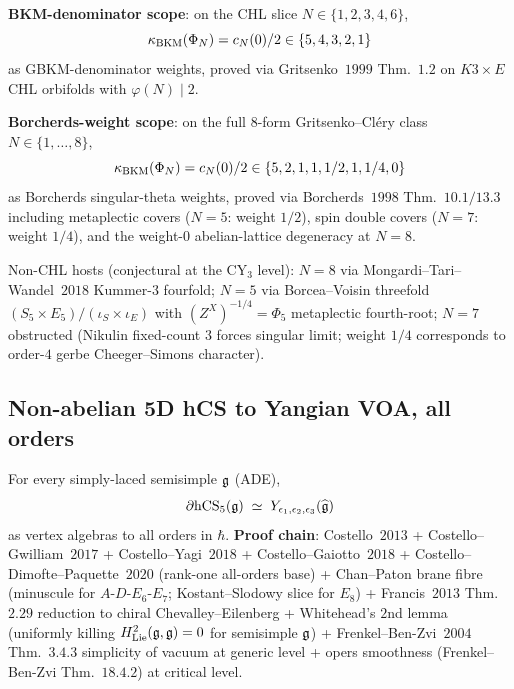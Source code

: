 \begin{theorem}\ClaimStatusTheorem
\label{wn:thm:plat-universal-kBKM}
\textbf{BKM-denominator scope}: on the CHL slice
$N \in \{1, 2, 3, 4, 6\}$,
\[
\kappa_{\mathrm{BKM}}(\Phi_N) = c_N(0)/2 \in \{5, 4, 3, 2, 1\}
\]
as GBKM-denominator weights, proved via Gritsenko~$1999$ Thm.~$1.2$ on
$K3 \times E$ CHL orbifolds with $\varphi(N) \mid 2$.

\textbf{Borcherds-weight scope}: on the full $8$-form
Gritsenko--Cl\'ery class $N \in \{1, \ldots, 8\}$,
\[
\kappa_{\mathrm{BKM}}(\Phi_N) = c_N(0)/2 \in \{5, 2, 1, 1, 1/2, 1, 1/4, 0\}
\]
as Borcherds singular-theta weights, proved via Borcherds~$1998$
Thm.~$10.1/13.3$ including metaplectic covers ($N{=}5$: weight $1/2$),
spin double covers ($N{=}7$: weight $1/4$), and the
weight-$0$ abelian-lattice degeneracy at $N{=}8$.

Non-CHL hosts (conjectural at the CY$_3$ level):
$N{=}8$ via Mongardi--Tari--Wandel~$2018$ Kummer-$3$ fourfold;
$N{=}5$ via Borcea--Voisin threefold $(S_5 \times E_5)/(\iota_S \times \iota_E)$
with $(Z^X)^{-1/4} = \Phi_5$ metaplectic fourth-root;
$N{=}7$ obstructed (Nikulin fixed-count $3$ forces singular limit;
weight $1/4$ corresponds to order-$4$ gerbe Cheeger--Simons character).
\end{theorem}

\subsection{Non-abelian 5D hCS to Yangian VOA, all orders}
\label{wn:subsec:plat-nonab-hCS-Yangian}

\begin{theorem}\ClaimStatusTheorem
\label{wn:thm:plat-nonab-compound}
For every simply-laced semisimple $\mathfrak{g}$ (ADE),
\[
\partial\mathrm{hCS}_5(\mathfrak{g}) \;\simeq\; Y_{\epsilon_1, \epsilon_2, \epsilon_3}
(\widehat{\mathfrak{g}})
\]
as vertex algebras to all orders in $\hbar$.
\textbf{Proof chain}: Costello~$2013$ + Costello--Gwilliam~$2017$ +
Costello--Yagi~$2018$ + Costello--Gaiotto~$2018$ +
Costello--Dimofte--Paquette~$2020$ (rank-one all-orders base) +
Chan--Paton brane fibre (minuscule for $A$-$D$-$E_6$-$E_7$;
Kostant--Slodowy slice for $E_8$) + Francis~$2013$ Thm.~$2.29$
reduction to chiral Chevalley--Eilenberg + Whitehead's $2$nd lemma
(uniformly killing $H^2_{\mathrm{Lie}}(\mathfrak{g}, \mathfrak{g}) = 0$ for semisimple $\mathfrak{g}$) +
Frenkel--Ben-Zvi~$2004$ Thm.~$3.4.3$ simplicity of vacuum at generic level
+ opers smoothness (Frenkel--Ben-Zvi Thm.~$18.4.2$) at critical level.
\end{theorem}

